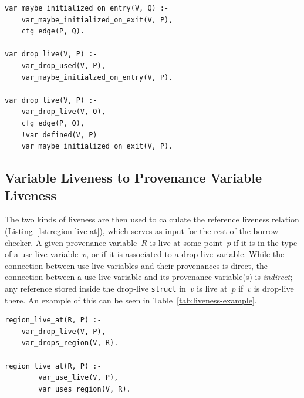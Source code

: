 \documentclass[11pt,a4paper,twoside,openany]{report}
\newenvironment{sourcecode}{\captionsetup{type=listing}}{}
\newcommand{\InRust}[1]{\texttt{#1}}
\begin{document}
\begin{sourcecode}
  \label{lst:use-live}
\begin{verbatim}
var_maybe_initialized_on_entry(V, Q) :-
    var_maybe_initialized_on_exit(V, P),
    cfg_edge(P, Q).

var_drop_live(V, P) :-
    var_drop_used(V, P),
    var_maybe_initialzed_on_entry(V, P).

var_drop_live(V, P) :-
    var_drop_live(V, Q),
    cfg_edge(P, Q),
    !var_defined(V, P)
    var_maybe_initialized_on_exit(V, P).
\end{verbatim}
\end{sourcecode}

\subsection{Variable Liveness to Provenance Variable Liveness}\label{sec:region-live-at}

The two kinds of liveness are then used to calculate the reference liveness
relation (Listing~\ref{lst:region-live-at}), which serves as input for the rest
of the borrow checker. A given provenance variable~$R$ is live at some point~$p$
if it is in the type of a use-live variable~$v$, or if it is associated to a
drop-live variable. While the connection between use-live variables and their
provenances is direct, the connection between a use-live variable and its
provenance variable(s) is \textit{indirect}; any reference stored inside the
drop-live \InRust{struct} in~$v$ is live at~$p$ if~$v$ is drop-live there. An
example of this can be seen in Table~\ref{tab:liveness-example}.

\begin{sourcecode}
  \label{lst:region-live-at}
\begin{verbatim}
region_live_at(R, P) :-
    var_drop_live(V, P),
    var_drops_region(V, R).
        
region_live_at(R, P) :-
        var_use_live(V, P),
        var_uses_region(V, R).
\end{verbatim}
\end{sourcecode}
\end{document}
